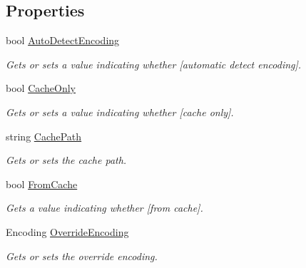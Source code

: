 \subsection*{Properties}
\begin{DoxyCompactItemize}
\item 
bool \hyperlink{class_html_agility_pack_1_1_html_web_a0b8012b915b48d9252012537c80577ea}{Auto\+Detect\+Encoding}
\begin{DoxyCompactList}\small\item\em Gets or sets a value indicating whether \mbox{[}automatic detect encoding\mbox{]}. \end{DoxyCompactList}\item 
bool \hyperlink{class_html_agility_pack_1_1_html_web_a8ba6b0779fd23a868474cdb18564f767}{Cache\+Only}
\begin{DoxyCompactList}\small\item\em Gets or sets a value indicating whether \mbox{[}cache only\mbox{]}. \end{DoxyCompactList}\item 
string \hyperlink{class_html_agility_pack_1_1_html_web_a2f882037a15e91c45e69397b185df84e}{Cache\+Path}
\begin{DoxyCompactList}\small\item\em Gets or sets the cache path. \end{DoxyCompactList}\item 
bool \hyperlink{class_html_agility_pack_1_1_html_web_a5a0858df3c5bb63411f9bfce81e93b20}{From\+Cache}
\begin{DoxyCompactList}\small\item\em Gets a value indicating whether \mbox{[}from cache\mbox{]}. \end{DoxyCompactList}\item 
Encoding \hyperlink{class_html_agility_pack_1_1_html_web_afa1ce1b7bbc645a5a933714563b6b134}{Override\+Encoding}
\begin{DoxyCompactList}\small\item\em Gets or sets the override encoding. \end{DoxyCompactList}\item 

\end{DoxyCompactItemize}
